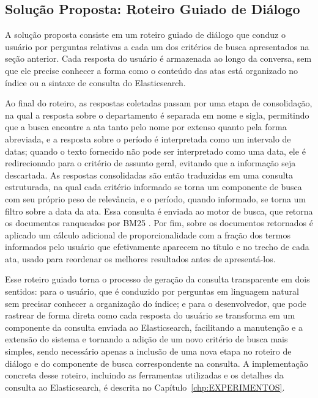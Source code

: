 \subsection{Solução Proposta: Roteiro Guiado de Diálogo}

A solução proposta consiste em um roteiro guiado de diálogo que conduz o usuário por perguntas relativas a cada um dos critérios de busca apresentados na seção anterior. Cada resposta do usuário é armazenada ao longo da conversa, sem que ele precise conhecer a forma como o conteúdo das atas está organizado no índice ou a sintaxe de consulta do Elasticsearch.

Ao final do roteiro, as respostas coletadas passam por uma etapa de consolidação, na qual a resposta sobre o departamento é separada em nome e sigla,  permitindo que a busca encontre a ata tanto pelo nome por extenso quanto pela forma abreviada, e a resposta sobre o período é interpretada como um intervalo de datas; quando o texto fornecido não pode ser interpretado como uma data, ele é redirecionado para o critério de assunto geral, evitando que a informação seja descartada. As respostas consolidadas são então traduzidas em uma consulta estruturada, na qual cada critério informado se torna um componente de busca com seu próprio peso de relevância, e o período, quando informado, se torna um filtro sobre a data da ata. Essa consulta é enviada ao motor de busca, que retorna os documentos ranqueados por BM25 \cite{IBMElasticsearch}. Por fim, sobre os documentos retornados é aplicado um cálculo adicional de proporcionalidade com a fração dos termos informados pelo usuário que efetivamente aparecem no título e no trecho de cada ata, usado para reordenar os melhores resultados antes de apresentá-los.

Esse roteiro guiado torna o processo de geração da consulta transparente em dois sentidos: para o usuário, que é conduzido por perguntas em linguagem natural sem precisar conhecer a organização do índice; e para o desenvolvedor, que pode rastrear de forma direta como cada resposta do usuário se transforma em um componente da consulta enviada ao Elasticsearch, facilitando a manutenção e a extensão do sistema e tornando a adição de um novo critério de busca mais simples, sendo necessário apenas a inclusão de uma nova etapa no roteiro de diálogo e do componente de busca correspondente na consulta. A implementação concreta desse roteiro, incluindo as ferramentas utilizadas e os detalhes da consulta ao Elasticsearch, é descrita no Capítulo~\ref{chp:EXPERIMENTOS}.
